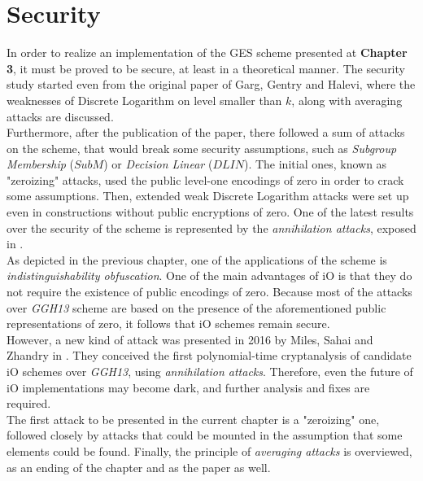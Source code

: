 \chapter {Security}

In order to realize an implementation of the GES scheme presented at \textbf{Chapter 3}, it must be proved to be secure, at least in a theoretical manner. The security study started even from the original paper of Garg, Gentry and Halevi, where the weaknesses of Discrete Logarithm on level smaller than $k$, along with averaging attacks are discussed.\\

Furthermore, after the publication of the paper, there followed a sum of attacks on the scheme, that would break some security assumptions, such as \textit{Subgroup Membership} ($SubM$) or \textit{Decision Linear} ($DLIN$). The initial ones, known as "zeroizing" attacks, used the public level-one encodings of zero in order to crack some assumptions. Then, extended weak Discrete Logarithm attacks were set up even in constructions without public encryptions of zero. One of the latest results over the security of the scheme is represented by the \textit{annihilation attacks}, exposed in \cite{MSZ16}.\\

As depicted in the previous chapter, one of the applications of the scheme is \textit{indistinguishability obfuscation}. One of the main advantages of iO is that they do not require the existence of public encodings of zero. Because most of the attacks over \textit{GGH13} scheme are based on the presence of the aforementioned public representations of zero, it follows that iO schemes remain secure.\\

However, a new kind of attack was presented in 2016 by Miles, Sahai and Zhandry in \cite{MSZ16}. They conceived the first polynomial-time cryptanalysis of candidate iO schemes over \textit{GGH13}, using \textit{annihilation attacks}. Therefore, even the future of iO implementations may become dark, and further analysis and fixes are required. \\

The first attack to be presented in the current chapter is a "zeroizing" one, followed closely by attacks that could be mounted in the assumption that some elements could be found. Finally, the principle of \textit{averaging attacks} is overviewed, as an ending of the chapter and as the paper as well.

